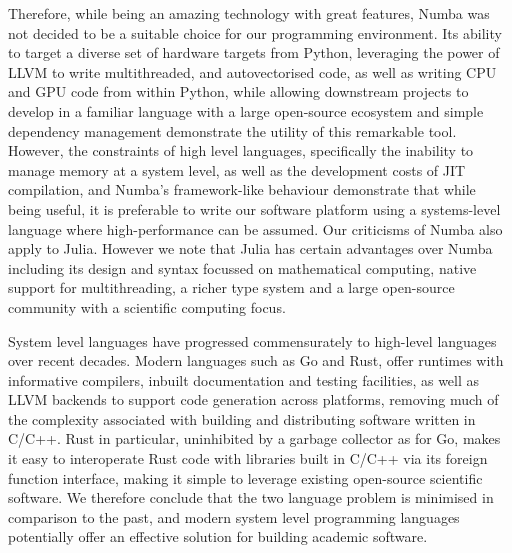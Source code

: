 Therefore, while being an amazing technology with great features, Numba was not decided to be a suitable choice for our programming environment. Its ability to target a diverse set of hardware targets from Python, leveraging the power of LLVM to write multithreaded, and autovectorised code, as well as writing CPU and GPU code from within Python, while allowing downstream projects to develop in a familiar language with a large open-source ecosystem and simple dependency management demonstrate the utility of this remarkable tool. However, the constraints of high level languages, specifically the inability to manage memory at a system level, as well as the development costs of JIT compilation, and Numba's framework-like behaviour demonstrate that while being useful, it is preferable to write our software platform using a systems-level language where high-performance can be assumed. Our criticisms of Numba also apply to Julia. However we note that Julia has certain advantages over Numba including its design and syntax focussed on mathematical computing, native support for multithreading, a richer type system and a large open-source community with a scientific computing focus.

System level languages have progressed commensurately to high-level languages over recent decades. Modern languages such as Go and Rust, offer runtimes with informative compilers, inbuilt documentation and testing facilities, as well as LLVM backends to support code generation across platforms, removing much of the complexity associated with building and distributing software written in C/C++. Rust in particular, uninhibited by a garbage collector as for Go, makes it easy to interoperate Rust code with libraries built in C/C++ via its foreign function interface, making it simple to leverage existing open-source scientific software.  We therefore conclude that the two language problem is minimised in comparison to the past, and modern system level programming languages potentially offer an effective solution for building academic software.

